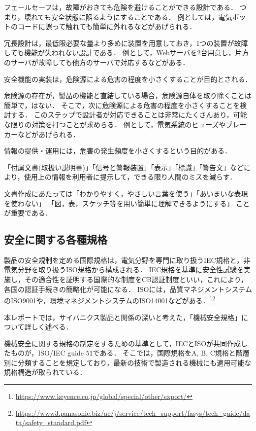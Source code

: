 \documentclass[uplatex,a4paper]{jsarticle}
\begin{document}
フェールセーフは，故障がおきても危険を避けることができる設計である．
つまり，壊れても安全状態に陥るようにすることである．
例としては，電気ポットのコードに誤って触れても簡単に外れるなどがあげられる．

冗長設計は，最低限必要な量より多めに装置を用意しておき，1つの装置が故障しても機能が失われない設計である．
例として，Webサーバを2台用意し，片方のサーバが故障しても他方のサーバで対応するなどがある．


安全機能の実装は，危険源による危害の程度を小さくすることが目的とされる．

危険源の存在が，製品の機能と直結している場合，危険源自体を取り除くことは簡単で，はない．
そこで，次に危険源による危害の程度を小さくすることを検討する．
このステップで設計者が対応できることは非常にたくさんあり，可能な限りの対策を打つことが求めらる．
例として，電気系統のヒューズやブレーカーなどがあげられる．


情報の提供・運用には，危害の発生頻度を小さくするという目的がある．

「付属文書(取扱い説明書)」「信号と警報装置」「表示」「標識」「警告文」などにより，使用上の情報を利用者に提示して，できる限り人間のミスを減らす．

文書作成にあたっては「わかりやすく，やさしい言葉を使う」「あいまいな表現を使わない」 「図，表，スケッチ等を用い簡単に理解できるようにする」 ことが重要である．



\subsection{安全に関する各種規格}
製品の安全規制を定める国際規格は，電気分野を専門に取り扱うIEC規格と，非電気分野を取り扱うISO規格から構成される．
IEC規格を基準に安全性試験を実施し，その適合性を証明する国際的な制度をCB認証制度といい，これにより，各国の認証手続きの簡略化が可能になる．
ISOには，品質マネジメントシステムのISO9001や，環境マネジメントシステムのISO14001などがある．\footnote{\url{https://www.keyence.co.jp/global/special/other/export/}}\footnote{\url{https://www3.panasonic.biz/ac/j/service/tech_support/fasys/tech_guide/data/safety_standard.pdf}}

本レポートでは，サイバニクス製品と関係の深いと考えた，「機械安全規格」について詳しく述べる．

機械安全に関する規格の制定をするための基準として，IECとISOが共同作成したものが，ISO/IEC guide 51である．
そこでは，国際規格をA, B, C規格と階層別に分類することを規定しており，最新の技術で製造される機械にも適用可能な規格構造が取られている．
\end{document}

